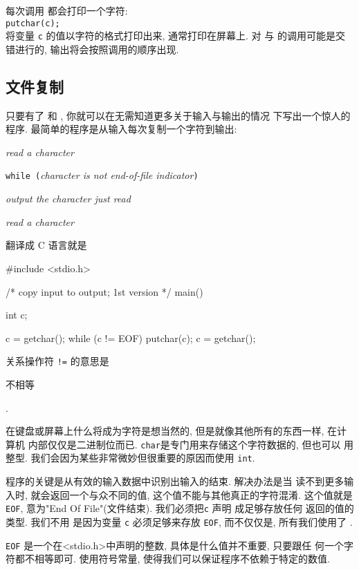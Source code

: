 每次调用 \cputchar 都会打印一个字符: \\ \verb"putchar(c);" \\ 将变量 
\verb"c" 的值以字符的格式打印出来, 通常打印在屏幕上. 对 \cputchar 与 \printf
的调用可能是交错进行的, 输出将会按照调用的顺序出现.

\subsection{文件复制}
只要有了 \cgetchar 和 \cputchar, 你就可以在无需知道更多关于输入与输出的情况
下写出一个惊人的程序. 最简单的程序是从输入每次复制一个字符到输出: \par 
\begin{mypsudo}
    \textit{read a character} \par
    \texttt{while (}\textit{character is not end-of-file indicator}\texttt{)}
    \par
    \hspace{2em}\textit{output the character just read} \par
    \hspace{2em}\textit{read a character} \par
\end{mypsudo}
翻译成 C 语言就是
\begin{myverbatim}
    #include <stdio.h>

    /* copy input to output; 1st version */
    main()
    {
        int c;

        c = getchar();
        while (c != EOF) {
            putchar(c);
            c = getchar();
        }
    }
\end{myverbatim}
关系操作符 \verb"!=" 的意思是\begin{myquotation}不相等\end{myquotation}.

在键盘或屏幕上什么将成为字符是想当然的, 但是就像其他所有的东西一样, 在计算机
内部仅仅是二进制位而已. \verb"char"是专门用来存储这个字符数据的, 但也可以
用整型. 我们会因为某些非常微妙但很重要的原因而使用 \verb"int".

程序的关键是从有效的输入数据中识别出输入的结束. 解决办法是当 \cgetchar
读不到更多输入时, 就会返回一个与众不同的值, 这个值不能与其他真正的字符混淆.
这个值就是\verb"EOF", 意为"End Of File"(文件结束). 我们必须把\verb"c" 声明
成足够存放任何 \cgetchar 返回的值的类型. 我们不用 \cchar 是因为变量 \verb"c"
必须足够来存放 \verb"EOF", 而不仅仅是\cchar, 所有我们使用了 \cint.

\verb"EOF" 是一个在<stdio.h>中声明的整数, 具体是什么值并不重要, 只要跟任
何一个字符都不相等即可. 使用符号常量, 使得我们可以保证程序不依赖于特定的数值.

